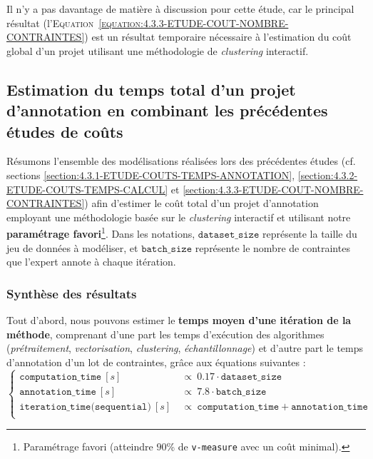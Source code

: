 			\begin{leftBarAuthorOpinion}
				Il n'y a pas davantage de matière à discussion pour cette étude, car le principal résultat (l'\textsc{Equation~\ref{equation:4.3.3-ETUDE-COUT-NOMBRE-CONTRAINTES}}) est un résultat temporaire nécessaire à l'estimation du coût global d'un projet utilisant une méthodologie de \textit{clustering} interactif.
			\end{leftBarAuthorOpinion}
	
	\subsection{Estimation du temps total d'un projet d'annotation en combinant les précédentes études de coûts}
	\label{section:4.3.4-ETUDE-COUTS-TOTAL}
	
		Résumons l'ensemble des modélisations réalisées lors des précédentes études (cf. sections \ref{section:4.3.1-ETUDE-COUTS-TEMPS-ANNOTATION}, \ref{section:4.3.2-ETUDE-COUTS-TEMPS-CALCUL} et \ref{section:4.3.3-ETUDE-COUT-NOMBRE-CONTRAINTES}) afin d'estimer le coût total d'un projet d'annotation employant une méthodologie basée sur le \textit{clustering} interactif et utilisant notre \textbf{paramétrage favori}\footnote{
			Paramétrage favori (atteindre $90$\% de \texttt{v-measure} avec un coût minimal).
		}.
		Dans les notations, $\texttt{dataset\_size}$ représente la taille du jeu de données à modéliser, et $\texttt{batch\_size}$ représente le nombre de contraintes que l'expert annote à chaque itération.

		\subsubsection{Synthèse des résultats}
			
			Tout d'abord, nous pouvons estimer le \textbf{temps moyen d'une itération de la méthode}, comprenant d'une part les temps d'exécution des algorithmes (\textit{prétraitement}, \textit{vectorisation}, \textit{clustering}, \textit{échantillonnage}) et d'autre part le temps d'annotation d'un lot de contraintes, grâce aux équations suivantes :
			\begin{equation}
				\label{equation:4.3.4-ETUDE-COUT-UNE-ITERATION-SEQUENTIELLE}
				\begin{cases}
					\texttt{computation\_time}~[s]&
						~\propto~0.17 \cdot \texttt{dataset\_size}\\
					\texttt{annotation\_time}~[s]&
						~\propto~7.8 \cdot \texttt{batch\_size} \\
					\texttt{iteration\_time(sequential)}~[s]&
						~\propto~\texttt{computation\_time} + \texttt{annotation\_time} \\
				\end{cases}
			\end{equation}
			
